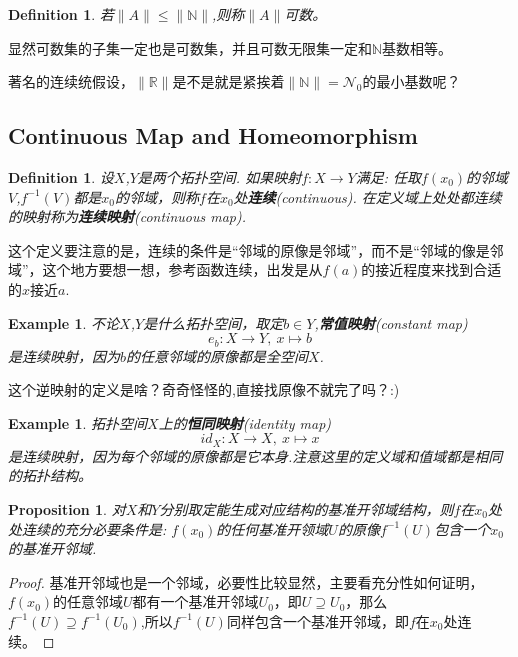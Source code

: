 \documentclass{article}
\newtheorem{proposition}[theorem]{Proposition}
\newtheorem{example}[theorem]{Example}
\newtheorem{definition}[theorem]{Definition}
\newcommand*{\xfunc}[4]{{#2}\colon{#3}{#1}{#4}}
\newcommand*{\func}[3]{\xfunc{\to}{#1}{#2}{#3}}
\begin{document}
\begin{definition}
若$\|A\| \leqslant \|\mathbb{N}\|$,则称$\|A\|$可数。 
\end{definition}

显然可数集的子集一定也是可数集，并且可数无限集一定和$\mathbb{N}$基数相等。

著名的连续统假设，$\|\mathbb{R}\|$是不是就是紧挨着$\|\mathbb{N}\|=\mathcal{N}_0$的最小基数呢？
\newpage
\subsection{Continuous Map and Homeomorphism}

\begin{definition}
设$X$,$Y$是两个拓扑空间. 如果映射$\func{f}{X}{Y}$满足: 任取$f(x_0)$的邻域$V$,$f^{-1}(V)$都是$x_0$的邻域，则称$f$在$x_0$处\textbf{连续}(continuous). 在定义域上处处都连续的映射称为\textbf{连续映射}(continuous map).
\end{definition}

这个定义要注意的是，连续的条件是“邻域的原像是邻域”，而不是“邻域的像是邻域”，这个地方要想一想，参考函数连续，出发是从$f(a)$的接近程度来找到合适的$x$接近$a$.

\begin{example}
不论$X$,$Y$是什么拓扑空间，取定$b \in Y$,\textbf{常值映射}(constant map)\[\func{e_b}{X}{Y},\ x \mapsto b\]是连续映射，因为$b$的任意邻域的原像都是全空间$X$.
\end{example}

这个逆映射的定义是啥？奇奇怪怪的,直接找原像不就完了吗？:)

\begin{example}
拓扑空间$X$上的\textbf{恒同映射}(identity map)\[\func{id_{X}}{X}{X},\ x\mapsto x\]是连续映射，因为每个邻域的原像都是它本身.注意这里的定义域和值域都是相同的拓扑结构。
\end{example}

\begin{proposition}
对$X$和$Y$分别取定能生成对应结构的基准开邻域结构，则$f$在$x_0$处处连续的充分必要条件是: $f(x_0)$的任何基准开领域$U$的原像$f^{-1}(U)$包含一个$x_0$的基准开邻域.
\end{proposition}

\begin{proof}
基准开邻域也是一个邻域，必要性比较显然，主要看充分性如何证明，$f(x_0)$的任意邻域$U$都有一个基准开邻域$U_0$，即$U \supseteq U_0$，那么$f^{-1}(U) \supseteq f^{-1}(U_0)$,所以$f^{-1}(U)$同样包含一个基准开邻域，即$f$在$x_0$处连续。
\end{proof}
\end{document}

